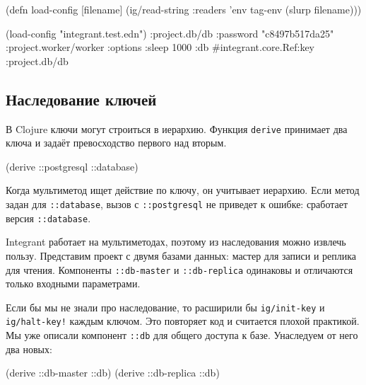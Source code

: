 \begin{english}
  \begin{clojure}
(defn load-config [filename]
  (ig/read-string {:readers {'env tag-env}}
                  (slurp filename)))

(load-config "integrant.test.edn")
{:project.db/db {:password "c8497b517da25"}
 :project.worker/worker
 {:options {:sleep 1000}
  :db #integrant.core.Ref{:key :project.db/db}}}
  \end{clojure}
\end{english}

\subsection{Наследование ключей}


В Clojure ключи могут строиться в иерархию. Функция \verb|derive| принимает
два ключа и задаёт превосходство первого над вторым.


\begin{english}
  \begin{clojure}
(derive ::postgresql ::database)
  \end{clojure}
\end{english}

Когда мультиметод ищет действие по ключу, он учитывает иерархию. Если метод
задан для \verb|::database|, вызов с \verb|::postgresql| не приведет к
ошибке: сработает версия \verb|::database|.

Integrant работает на мультиметодах, поэтому из наследования можно извлечь
пользу. Представим проект с двумя базами данных: мастер для записи и реплика для
чтения. Компоненты \verb|::db-master| и \verb|::db-replica| одинаковы и
отличаются только входными параметрами.

Если бы мы не знали про наследование, то расширили бы \verb|ig/init-key| и
\verb|ig/halt-key!| каждым ключом. Это повторяет код и считается плохой
практикой. Мы уже описали компонент \verb|::db| для общего доступа к
базе. Унаследуем от него два новых:

\begin{english}
  \begin{clojure}
(derive ::db-master ::db)
(derive ::db-replica ::db)
  \end{clojure}
\end{english}

